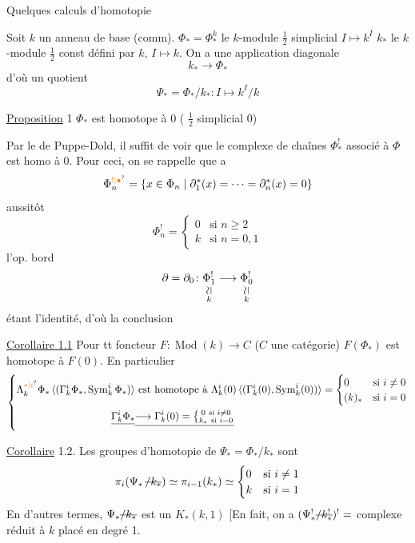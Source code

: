 
Quelques calculs d'homotopie

Soit $k$ un anneau de base (comm). $\Phi_*=\Phi_*^k$  le $k$-module $\tfrac12$ simplicial $I\longmapsto k^I$ $k_*$ le $k$-module $\tfrac12$  const défini par $k$, $I\longmapsto k$. On a une application diagonale
\[
 k_*\longrightarrow\Phi_*
\]
d'où un quotient
\[
 \Psi_*=\Phi_*/k_*\colon I\longmapsto k^I/k
\]

\uline{Proposition} 1 \quad $\Phi_*$ est homotope à 0  ( $\tfrac12$ simplicial 0)

Par le  de Puppe-Dold, il suffit de voir que le complexe de chaînes $\Phi_*^!$ associé \deleted{$\Phi$} à $\Phi$ est homo à 0. Pour ceci, on se rappelle que a
\[
 \Phi_n^{\unsure{!|\bullet}}=\{x\in\Phi_n\mid\partial_1^*(x)=\cdots=\partial_n^*(x)=0\}
\]
 aussitôt
\[
 \Phi_n^!=\begin{cases}0&\text{si }n\geq2\\ k&\text{si }n=0,1\end{cases}
\]
l'op.  bord
\[
 \partial=\partial_0\colon\underset{\substack{\rotatebox{90}{$\simeq$}\\k}}{\Phi_1^!}\longrightarrow
 \underset{\substack{\rotatebox{90}{$\simeq$}\\k}}{\Phi_0^!}
\]
étant l'identité, d'où la conclusion

\uline{Corollaire 1.1} Pour tt foncteur $F\colon\operatorname{Mod}(k)\longrightarrow C$ ($C$ une catégorie) $F(\Phi_*)$ est homotope à $F(0)$. En particulier
\[
 \left\{\begin{aligned}
 \Lambda_k^{\unsure{*|i}}\Phi_*\,\inserted{(\Gamma_k^i\Phi_*,\operatorname{Sym}_k^i\Phi_*)}
 &\text{ est homotope à }\Lambda_k^i(0)\,\inserted{(\Gamma_k^i(0),\operatorname{Sym}_k^i(0))}
 =\begin{cases}0&\text{si }i\ne0\\(k)_*&\text{si }i=0\end{cases}\\
 \deleted{\Gamma_k^i\Phi_*}&\deleted{\longrightarrow\Gamma_k^i(0)=
 \left\{\substack{0\ \text{si }i\ne0\\k_*\ \text{si }i=0}\right.}
 \end{aligned}\right.
\]

\uline{Corollaire} 1.2. Les groupes d'homotopie de $\Psi_*=\Phi_*/k_*$ sont
\[
 \pi_i(\Psi_*\,\deleted{/k_*})\simeq\pi_{i-1}(k_*)\simeq
 \begin{cases}0&\text{si }i\ne1\\ k&\text{si }i=1\end{cases}
\]
En d'autres termes, $\Psi_*\deleted{/k_*}$ est un $K_*(k,1)$
\margin{$\big[$}
[En fait, on a $(\Psi_*^!\deleted{/k_*^!})^!=$ complexe réduit à $k$ placé en degré 1.

